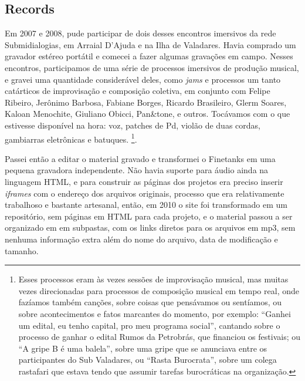 \subsection{Records}
Em 2007 e 2008, pude participar de dois desses encontros imersivos da rede Submidialogias, em Arraial D'Ajuda e na Ilha de Valadares. Havia comprado um gravador estéreo portátil e comecei a fazer algumas gravações em campo. Nesses encontros, participamos de uma série de processos imersivos de produção musical, e gravei uma quantidade considerável deles, como \emph{jams} e processos um tanto catárticos de improvisação e composição coletiva, em conjunto com Felipe Ribeiro, Jerônimo Barbosa, Fabiane Borges, Ricardo Brasileiro, Glerm Soares, Kaloan Menochite, Giuliano Obicci, Pan\&tone, e outros. Tocávamos com o que estivesse disponível na hora: voz, patches de Pd, violão de duas cordas, gambiarras eletrônicas e batuques. \footnote{Esses processos eram às vezes sessões de improvisação musical, mas muitas vezes direcionadas para processos de composição musical em tempo real, onde fazíamos também canções, sobre coisas que pensávamos ou sentíamos, ou sobre acontecimentos e fatos marcantes do momento, por exemplo: ``Ganhei um edital, eu tenho capital, pro meu programa social'', cantando sobre o processo de ganhar o edital Rumos da Petrobrás, que financiou os festivais; ou ``A gripe B é uma balela'', sobre uma gripe que se anunciava entre os participantes do Sub Valadares, ou ``Rasta Burocrata'', sobre um colega rastafari que estava tendo que assumir tarefas burocráticas na organização.}.


Passei então a editar o material gravado e transformei o Finetanks em uma pequena gravadora independente. Não havia suporte para áudio ainda na linguagem HTML, e para construir as páginas dos projetos era preciso inserir \emph{iframes} com o endereço dos arquivos originais, processo que era relativamente trabalhoso e bastante artesanal, então, em 2010 o site foi transformado em um repositório, sem páginas em HTML para cada projeto, e o material passou a ser organizado em em subpastas, com os links diretos para os arquivos em mp3, sem nenhuma informação extra além do nome do arquivo, data de modificação e tamanho. 


